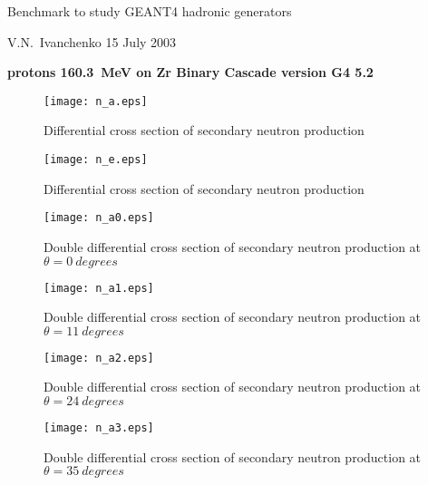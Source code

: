 \documentclass[12pt]{article}
\begin{document}
\pagestyle{empty}

\begin{center}
{\large Benchmark to study GEANT4 hadronic generators}

\vspace*{5mm}
{V.N.~Ivanchenko 15 July 2003}

\vspace*{5mm}


\vspace*{5mm}

{\bf protons 160.3~MeV on Zr Binary Cascade version G4 5.2}

\vspace*{1mm}


\end{center}


\begin{figure}[htbp]
\caption{Differential cross section of secondary neutron production}
\label{fig10}
\centerline{\texttt{[image: n\_a.eps]}}
\end{figure}

\begin{figure}[htbp]
\caption{Differential cross section of secondary neutron production}
\label{fig7}
\centerline{\texttt{[image: n\_e.eps]}}
\end{figure}




\clearpage


\begin{figure}[htbp]
\caption{Double differential cross section of secondary neutron production at $\theta = 0~degrees$}
\label{figa0}
\centerline{\texttt{[image: n\_a0.eps]}}
\end{figure}

\begin{figure}[htbp]
\caption{Double differential cross section of secondary neutron production at $\theta = 11~degrees$}
\label{figa1}
\centerline{\texttt{[image: n\_a1.eps]}}
\end{figure}

\begin{figure}[htbp]
\caption{Double differential cross section of secondary neutron production at $\theta = 24~degrees$}
\label{figa2}
\centerline{\texttt{[image: n\_a2.eps]}}
\end{figure}

\clearpage

\begin{figure}[htbp]
\caption{Double differential cross section of secondary neutron production at $\theta = 35~degrees$}
\label{figa3}
\centerline{\texttt{[image: n\_a3.eps]}}
\end{figure}
\end{document}
